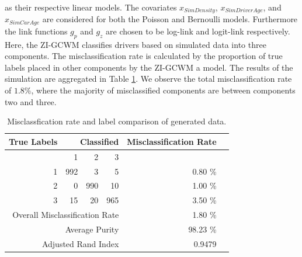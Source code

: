 \documentclass[11pt,letterpaper]{article}
\numberwithin{equation}{section}
\numberwithin{equation}{section}
\numberwithin{equation}{section}
\begin{document}
as their respective linear models.  The covariates $x_{SimDensity}$, $x_{SimDriverAge}$, and $x_{SimCarAge}$ are considered for both the Poisson and Bernoulli models. Furthermore the link functions $g_p$ and $g_z$ are chosen to be log-link and logit-link respectively. 
 Here, the ZI-GCWM classifies drivers based on simulated data into three components. The misclassification rate is calculated by the proportion of true labels placed in other components by the ZI-GCWM a model.  The results of the simulation are aggregated in Table \ref{misclassTable}. We observe the total misclassification rate of $1.8 \% $, where the majority of misclassified components are between components two and three.
\begin{table}[!htb]
\begin{center}
\caption{Misclassfication rate and label comparison of generated data.}
\label{misclassTable}
\begin{tabular}{r| r r r| r r}
\hline
    True Labels       &  \multicolumn{3}{r}{ Classified }  \vline & Misclassification Rate  &  \\ \hline
   & 1                              & 2   & 3   &                            &  \\ \hline
 1              & 992                            & 3   & 5   & 0.80 \%                                      &  \\
 2              & 0                              & 990 & 10  & 1.00 \%                                       &  \\
 3              & 15                             & 20  & 965 & 3.50 \%                                      &  \\  \hline
                \multicolumn{4}{r}{Overall Misclassification Rate}        & 1.80 \%                  & \\
        		\multicolumn{4}{r}{Average Purity} & 98.23 \%  
        		\\ \hline
                \multicolumn{4}{r}{Adjusted Rand Index} & 0.9479 &  \\
    \hline
\end{tabular}
\end{center}
\end{table}
\end{document}

